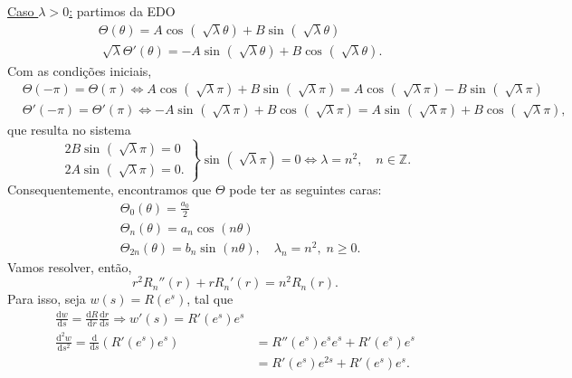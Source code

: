 \documentclass[../pde_notes.tex]{subfiles}
\begin{document}
\underline{Caso \(\lambda > 0\):} partimos da EDO
\begin{align*}
	 & \Theta (\theta ) = A\cos^{}{(\sqrt[]{\lambda }\theta )} + B\sin^{}{(\sqrt[]{\lambda }\theta )}                      \\
	 & \sqrt[]{\lambda  }\Theta '(\theta ) = -A\sin^{}{(\sqrt[]{\lambda }\theta )} + B\cos^{}{(\sqrt[]{\lambda }\theta )}.
\end{align*}
Com as condições iniciais,
\begin{align*}
	 & \Theta (-\pi ) = \Theta (\pi ) \Longleftrightarrow A\cos^{}{(\sqrt[]{\lambda }\pi )} + B\sin^{}{(\sqrt[]{\lambda }\pi )} = A\cos^{}{(\sqrt[]{\lambda }\pi )} - B\sin^{}{(\sqrt[]{\lambda }\pi )}     \\
	 & \Theta' (-\pi ) = \Theta '(\pi ) \Longleftrightarrow -A\sin^{}{(\sqrt[]{\lambda }\pi )} + B\cos^{}{(\sqrt[]{\lambda }\pi )} = A\sin^{}{(\sqrt[]{\lambda }\pi )} + B\cos^{}{(\sqrt[]{\lambda }\pi )},
\end{align*}
que resulta no sistema
\[
	\left.\begin{array}{ll}
		2B\sin^{}{(\sqrt[]{\lambda }\pi )} = 0 \\
		2A\sin^{}{(\sqrt[]{\lambda }\pi )} = 0.
	\end{array}\right\} \sin^{}{(\sqrt[]{\lambda }\pi )} = 0 \Longleftrightarrow \lambda = n^{2},\quad n\in \mathbb{Z}.
\]
Consequentemente, encontramos que \(\Theta \) pode ter as seguintes caras:
\begin{align*}
	 & \Theta_{0}(\theta ) = \frac{a_{0}}{2}                                                  \\
	 & \Theta_{n}(\theta ) = a_{n}\cos^{}{(n\theta )}                                         \\
	 & \Theta_{2n}(\theta ) = b_{n}\sin^{}{(n\theta )}, \quad \lambda_{n} = n^{2},\; n\geq 0.
\end{align*}
Vamos resolver, então,
\[
	r^{2}R_{n}''(r) + rR_{n}'(r) = n^{2}R_{n}(r).
\]
Para isso, seja \(w(s) = R(e^{s})\), tal que
\begin{align*}
	\frac{\mathrm{d}w}{\mathrm{d}s} = \frac{\mathrm{d}R}{\mathrm{d}r}\frac{\mathrm{d}r}{\mathrm{d}s} \Rightarrow w'(s) = R'(e^{s})e^{s} \\
	\frac{\mathrm{d}^{2}w}{\mathrm{d}s^{2}} = \frac{\mathrm{d}}{\mathrm{d}s}(R'(e^{s})e^{s}) & =R''(e^{s})e^{s}e^{s} + R'(e^{s})e^{s}   \\
	                                                                                         & =R'(e^{s})e^{2s}+ R'(e^{s})e^{s}.
\end{align*}
\end{document}
